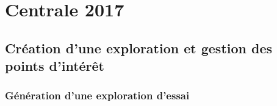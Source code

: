 \chapter{Centrale 2017}
\section{Création d'une exploration et gestion des points d'intérêt}
\subsection{Génération d'une exploration d'essai}
